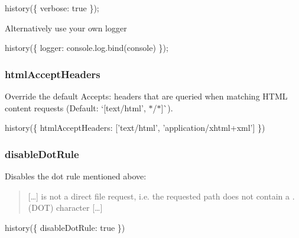 \begin{DoxyCode}
history(\{
  verbose: true
\});
\end{DoxyCode}


Alternatively use your own logger


\begin{DoxyCode}
history(\{
  logger: console.log.bind(console)
\});
\end{DoxyCode}


\subsubsection*{html\+Accept\+Headers}

Override the default {\ttfamily Accepts\+:} headers that are queried when matching H\+T\+ML content requests (Default\+: `\mbox{[}\textquotesingle{}text/html', \textquotesingle{}$\ast$/$\ast$\textquotesingle{}\mbox{]}\`{}).


\begin{DoxyCode}
history(\{
  htmlAcceptHeaders: ['text/html', 'application/xhtml+xml']
\})
\end{DoxyCode}


\subsubsection*{disable\+Dot\+Rule}

Disables the dot rule mentioned above\+:

\begin{quote}
\mbox{[}…\mbox{]} is not a direct file request, i.\+e. the requested path does not contain a {\ttfamily .} (D\+OT) character \mbox{[}…\mbox{]} \end{quote}



\begin{DoxyCode}
history(\{
  disableDotRule: true
\})
\end{DoxyCode}
 